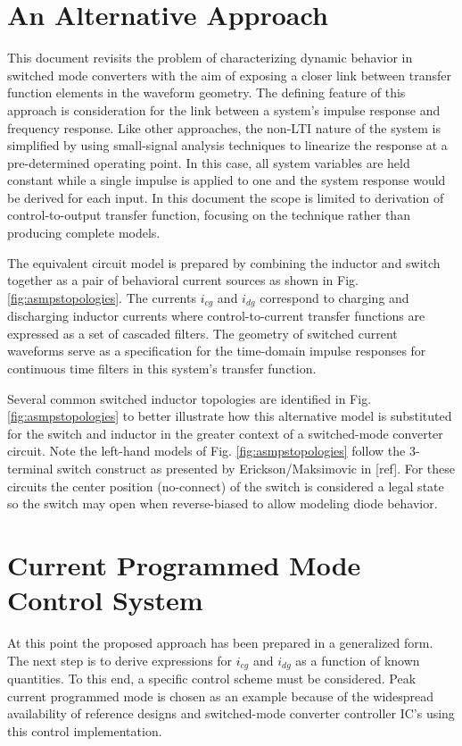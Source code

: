 \documentclass[conference]{IEEEtran}
\begin{document}
\section{An Alternative Approach}
This document revisits the problem of characterizing dynamic behavior in switched mode converters with the aim of exposing a closer link between transfer function elements in the waveform geometry. The defining feature of this approach is consideration for the link between a system's impulse response and frequency response. Like other approaches, the non-LTI nature of the system is simplified by using small-signal analysis techniques to linearize the response at a pre-determined operating point.  In this case, all system variables are held constant while a single impulse is applied to one and the system response would be derived for each input. In this document the scope is limited to derivation of control-to-output transfer function, focusing on the technique rather than producing complete models.

The equivalent circuit model is prepared by combining the inductor and switch together as a pair of behavioral current sources as shown in Fig. \ref{fig:asmpstopologies}. The currents $i_{cg}$ and $i_{dg}$ correspond to charging and discharging inductor currents where control-to-current transfer functions are expressed as a set of cascaded filters.  The geometry of switched current waveforms serve as a specification for the time-domain impulse responses for continuous time filters in this system's transfer function.

Several common switched inductor topologies are identified in Fig. \ref{fig:asmpstopologies} to better illustrate how this alternative model is substituted for the switch and inductor in the greater context of a switched-mode converter circuit.  Note the left-hand models of Fig. \ref{fig:asmpstopologies} follow the 3-terminal switch construct as presented by Erickson/Maksimovic in [ref].  For these circuits the center position (no-connect) of the switch is considered a legal state so the switch may open when reverse-biased to allow modeling diode behavior.

\section{Current Programmed Mode Control System}
At this point the proposed approach has been prepared in a generalized form. The next step is to derive expressions for $i_{cg}$ and $i_{dg}$ as a function of known quantities. To this end, a specific control scheme must be considered. Peak current programmed mode is chosen as an example because of the widespread availability of reference designs and switched-mode converter controller IC's using this control implementation.
\end{document}
